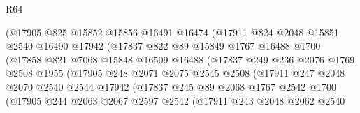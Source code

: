 \begin{lexlean}{R64}
\begin{coremodule}
                        (@17905
                          @825
                          @15852
                          @15856
                          @16491
                          @16474
                          (@17911
                            @824
                            @2048
                            @15851
                            @2540
                            @16490
                            @17942
                            (@17837
                              @822
                              @89
                              @15849
                              @1767
                              @16488
                              @1700
                              (@17858
                                @821
                                @7068
                                @15848
                                @16509
                                @16488
                                (@17837
                                  @249
                                  @236
                                  @2076
                                  @1769
                                  @2508
                                  @1955
                                  (@17905
                                    @248
                                    @2071
                                    @2075
                                    @2545
                                    @2508
                                    (@17911
                                      @247
                                      @2048
                                      @2070
                                      @2540
                                      @2544
                                      @17942
                                      (@17837
                                        @245
                                        @89
                                        @2068
                                        @1767
                                        @2542
                                        @1700
                                        (@17905
                                          @244
                                          @2063
                                          @2067
                                          @2597
                                          @2542
                                          (@17911
                                            @243
                                            @2048
                                            @2062
                                            @2540

\end{coremodule}
\end{lexlean}
